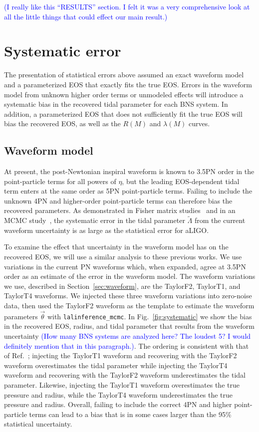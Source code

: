 \documentclass[twocolumn,prd,amssymb,aps,nofootinbib,showpacs,epsf]{revtex4}
\newcommand\les[2]{\textcolor{blue}{{#1}\sout{#2}}}
\begin{document}
\les{(I really like this ``RESULTS'' section.  I felt it was a very comprehensive look at all the little things that could effect our main result.)}{}

\section{Systematic error}
\label{sec:systematic}

The presentation of statistical errors above assumed an exact waveform model and a parameterized EOS that exactly fits the true EOS. Errors in the waveform model from unknown higher order terms or unmodeled effects will introduce a systematic bias in the recovered tidal parameter for each BNS system. In addition, a parameterized EOS that does not sufficiently fit the true EOS will bias the recovered EOS, as well as the $R(M)$ and $\lambda(M)$ curves.

\subsection{Waveform model}

At present, the post-Newtonian inspiral waveform is known to 3.5PN order in the point-particle terms for all powers of $\eta$, but the leading EOS-dependent tidal term enters at the same order as 5PN point-particle terms. Failing to include the unknown 4PN and higher-order point-particle terms can therefore bias the recovered parameters. As demonstrated in Fisher matrix studies~\cite{Favata2014, YagiYunes2014} and in an MCMC study~\cite{WadeCreightonOchsner2014}, the systematic error in the tidal parameter $\tilde\Lambda$ from the current waveform uncertainty is as large as the statistical error for aLIGO. 

To examine the effect that uncertainty in the waveform model has on the recovered EOS, we will use a similar analysis to these previous works. We use variations in the current PN waveforms which, when expanded, agree at 3.5PN order as an estimate of the error in the waveform model. The waveform variations we use, described in Section~\ref{sec:waveform}, are the TaylorF2, TaylorT1, and TaylorT4 waveforms. We injected these three waveform variations into zero-noise data, then used the TaylorF2 waveform as the template to estimate the waveform parameters $\vec\theta$ with \texttt{lalinference\_mcmc}. In Fig.~\ref{fig:systematic} we show the bias in the recovered EOS, radius, and tidal parameter that results from the waveform uncertainty \les{(How many BNS systems are analyzed here? The loudest 5?  I would definitely mention that in this paragraph.)}{}. The ordering is consistent with that of Ref.~\cite{WadeCreightonOchsner2014}; injecting the TaylorT1 waveform and recovering with the TaylorF2 waveform overestimates the tidal parameter while injecting the TaylorT4 waveform and recovering with the TaylorF2 waveform underestimates the tidal parameter. Likewise, injecting the TaylorT1 waveform overestimates the true pressure and radius, while the TaylorT4 waveform underestimates the true pressure and radius. Overall, failing to include the correct 4PN and higher point-particle terms can lead to a bias that is in some cases larger than the 95\% statistical uncertainty.
\end{document}
